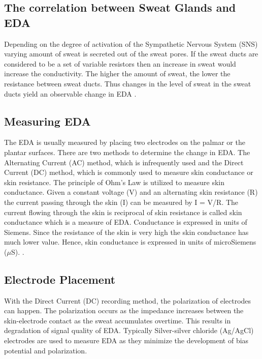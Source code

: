 \subsection{The correlation between Sweat Glands and EDA}
Depending on the degree of activation of the Sympathetic Nervous System (SNS) varying amount of sweat is secreted out of the sweat pores. If the sweat ducts are considered to be a set of variable resistors then an increase in sweat would increase the conductivity. The higher the amount of sweat, the lower the resistance between sweat ducts. Thus changes in the level of sweat in the sweat ducts yield an observable change in EDA \cite{cacioppo_electrodermal_2016_p_217_243}.

\subsection{Measuring EDA}
The EDA is usually measured by placing two electrodes on the palmar or the plantar surfaces. There are two methods to determine the change in EDA. The Alternating Current (AC) method, which is infrequently used and the Direct Current (DC) method, which is commonly used to measure skin conductance or skin resistance. The principle of Ohm's Law is utilized to measure skin conductance. Given a constant voltage (V) and an alternating skin resistance (R) the current passing through the skin (I) can be measured by I = V/R. The current flowing through the skin is reciprocal of skin resistance is called skin conductance which is a measure of EDA. Conductance is expressed in units of Siemens. Since the resistance of the skin is very high the skin conductance has much lower value. Hence, skin conductance is expressed in units of microSiemens ($\mu$S). \cite{cacioppo_electrodermal_2016_p_217_243}.

\subsection{Electrode Placement}
\label{sec:electrode_placement}
With the Direct Current (DC) recording method, the polarization of electrodes can happen. The polarization occurs as the impedance increases between the skin-electrode contact as the sweat accumulates overtime. This results in degradation of signal quality of EDA. Typically Silver-silver chloride (Ag/AgCl) electrodes are used to measure EDA as they minimize the development of bias potential and polarization. 

